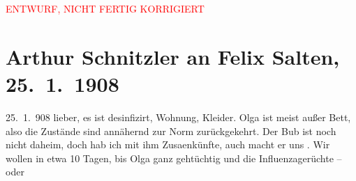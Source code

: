 
\begin{center}
            \textcolor{red}{ENTWURF, NICHT FERTIG KORRIGIERT}
                      \end{center}
            
         
         \renewcommand{\erwaehntePersonen}{Personen: Richard Beer-Hofmann, Samuel Fischer, Anna Katharina Rehmann, Felix Salten, Ottilie Salten, Paul Salten, Olga Schnitzler, Heinrich Schnitzler}
         \renewcommand{\erwaehnteInstitutionen}{Institutionen: Franz-Grillparzer-Preis}
         \renewcommand{\erwaehnteOrte}{Orte: Semmering, Wien}
         \renewcommand{\erwaehnteWerke}{Werke: Der Weg ins Freie. Roman}
               \section[Arthur Schnitzler an Felix Salten, 25. 1. 1908]{ Arthur Schnitzler an Felix Salten, 25. 1. 1908}\nopagebreak{}\rehead{ }\begin{ledgroupsized}[t]{13cm}\normalsize\beginnumbering \toendnotes[C]{\smallbreak\pagebreak[2]} 
\toendnotes[C]{\smallbreak}\pstart
           \raggedleft{}{\pb}25. 1. 908\pend
           \pstart
           lieber, es ist desinfizirt, Wohnung, Kleider. Olga ist meist außer Bett, also die Zustände sind annähernd
               zur Norm zurückgekehrt. Der Bub ist noch nicht daheim, doch hab ich mit ihm Zusa{\geminationm}enkünfte, auch macht er uns \label{K_L03011-1v}\label{K_L03011-1h}. Wir wollen in etwa 10 Tagen, bis Olga ganz gehtüchtig und die Influenzagerüchte – oder

\end{ledgroupsized}
